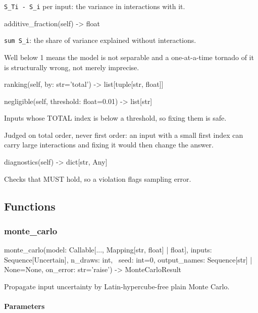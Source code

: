 \documentclass[10pt,a4paper,twoside]{report}
\begin{document}
\texttt{S\_Ti - S\_i} per input: the variance in interactions with it.

\begin{verbatimsmall}
additive_fraction(self) -> float
\end{verbatimsmall}

\texttt{sum S\_i}: the share of variance explained without interactions.

Well below 1 means the model is not separable and a one-at-a-time tornado of it is structurally wrong, not merely imprecise.

\begin{verbatimsmall}
ranking(self, by: str='total') -> list[tuple[str, float]]
\end{verbatimsmall}

\begin{verbatimsmall}
negligible(self, threshold: float=0.01) -> list[str]
\end{verbatimsmall}

Inputs whose TOTAL index is below a threshold, so fixing them is safe.

Judged on total order, never first order: an input with a small first index can carry large interactions and fixing it would then change the answer.

\begin{verbatimsmall}
diagnostics(self) -> dict[str, Any]
\end{verbatimsmall}

Checks that MUST hold, so a violation flags sampling error.

\subsection*{Functions}

\subsubsection*{monte\_carlo}

\begin{verbatimsmall}
monte_carlo(model: Callable[..., Mapping[str, float] | float], inputs: Sequence[Uncertain], n_draws: int, 
    \ seed: int=0, output_names: Sequence[str] | None=None, on_error: str='raise') -> MonteCarloResult
\end{verbatimsmall}

Propagate input uncertainty by Latin-hypercube-free plain Monte Carlo.

\paragraph*{Parameters}
\end{document}
